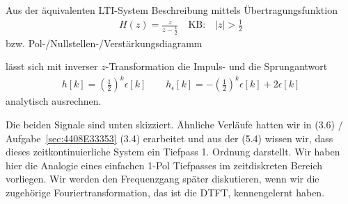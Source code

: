 \begin{Loesung}
Aus der äquivalenten LTI-System Beschreibung mittels Übertragungsfunktion
\begin{align}
H(z) = \frac{z}{z-\frac{1}{2}}\quad\text{KB:}\quad|z|>\frac{1}{2}
\end{align}
bzw. Pol-/Nullstellen-/Verstärkungsdiagramm
%
\begin{center}
\end{center}
%
lässt sich mit inverser $z$-Transformation die Impuls- und die Sprungantwort
\begin{align}
h[k] = \left(\frac{1}{2}\right)^k \epsilon[k]\qquad
h_\epsilon[k] = - \left(\frac{1}{2}\right)^k \epsilon[k] + 2 \epsilon[k]
\end{align}
analytisch ausrechnen.

Die beiden Signale sind unten skizziert. Ähnliche Verläufe hatten wir in
 (3.6) / Aufgabe~\ref{sec:4408E33353} (3.4)
erarbeitet und aus der  (5.4) wissen wir, dass dieses
zeitkontinuierliche System ein Tiefpass 1. Ordnung darstellt.
%
Wir haben hier die Analogie eines einfachen 1-Pol Tiefpasses im zeitdiskreten
Bereich vorliegen. Wir werden den Frequenzgang später diskutieren, wenn
wir die zugehörige Fouriertransformation, das ist die DTFT, kennengelernt haben.
%


\end{Loesung}
